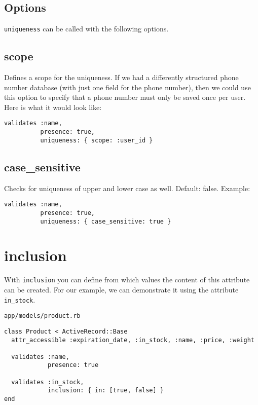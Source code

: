 \documentclass[a4paper]{book}
\newcounter{tab}[chapter]
\newcommand{\chap}[1]{\newpage\thispagestyle{empty}\chapter{#1}\label{chap:\thechapter}}
\begin{document}
\section{Options}\label{options-5}

\texttt{uniqueness} can be called with the following options.

\section{scope}\label{scope}

Defines a scope for the uniqueness. If we had a differently structured phone number database (with just one field for the phone number), then we could use this option to specify that a phone number must only be saved once per user. Here is what it would look like:

\begin{shaded}\begin{verbatim}
validates :name,
          presence: true,
          uniqueness: { scope: :user_id }
\end{verbatim}\end{shaded}

\section{case\_sensitive}\label{caseux5fsensitive}

Checks for uniqueness of upper and lower case as well. Default: false. Example:

\begin{shaded}\begin{verbatim}
validates :name,
          presence: true,
          uniqueness: { case_sensitive: true }
\end{verbatim}\end{shaded}

\chap{inclusion}\label{inclusion}

With \texttt{inclusion} you can define from which values the content of this attribute can be created. For our example, we can demonstrate it using the attribute \texttt{in\_stock}.

\texttt{app/models/product.rb}

\begin{shaded}\begin{verbatim}
class Product < ActiveRecord::Base
  attr_accessible :expiration_date, :in_stock, :name, :price, :weight

  validates :name,
            presence: true

  validates :in_stock,
            inclusion: { in: [true, false] }
end
\end{verbatim}\end{shaded}
\end{document}
